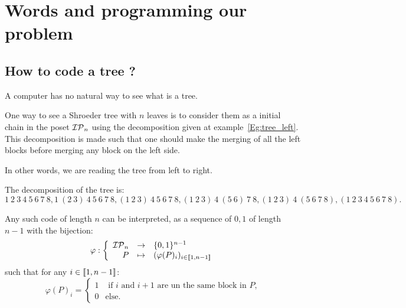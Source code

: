 \section{Words and programming our problem}

\subsection{How to code a tree ? }

A computer has no natural way to see what is a tree.

One way to see a Shroeder tree with $n$ leaves is to consider them as a initial chain in the poset $\mathcal{IP}_{n}$ using the decomposition given at example~\ref{Eg:tree_left}. This decomposition is made such that one should make the merging of all the left blocks before merging any block on the left side.

\begin{Rq}
	In other words, we are reading the tree from left to right.
\end{Rq}
\begin{Eg} The decomposition of the tree
	 is:
\begin{equation}
	1~2~3~4~5~6~7~8, 1~(2~3)~4~5~6~7~8,(1~2~3)~4~5~6~7~8,(1~2~3)~4~(5~6)~7~8,(1~2~3)~4~(5~6~7~8),(1~2~3~4~5~6~7~8). 
\end{equation}
\end{Eg}

Any such code of length $n$ can be interpreted, as a sequence of $0,1$ of length $n-1$ with the bijection:
\[
\varphi: \left\lbrace\begin{array}{rcl}
	\mathcal{IP}_{n} & \rightarrow & \{0,1\}^{n-1} \\
	P & \mapsto & (\varphi(P)_i)_{i\in\llbracket 1,n-1 \rrbracket}
\end{array} \right.
\]
such that for any $i\in\llbracket 1,n-1 \rrbracket$:
\[
\varphi(P)_i=\begin{cases}
	1 &\text{ if } i \text{ and }i+1 \text{ are un the same block in }P, \\
	0 & \text{else}.
\end{cases}
\]

